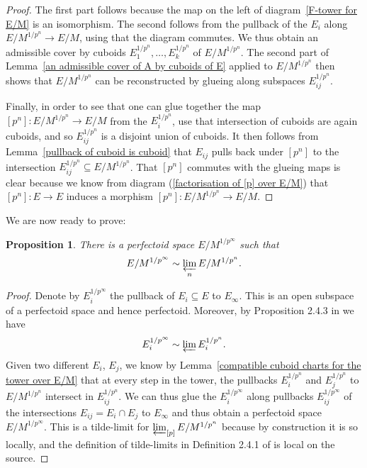 \documentclass[10pt,oneside]{amsart}
\newtheorem{proposition}[theorem]{Proposition}
\theoremstyle{definition}
\theoremstyle{remark}
\begin{document}
		\begin{proof}
		The first part follows because the map on the left of diagram~\ref{F-tower for E/M} is an isomorphism. The second follows from the pullback of the $E_i$ along $E/M^{1/p^n}\rightarrow E/M$, using that the diagram commutes.
		We thus obtain an admissible cover by cuboids $E_1^{1/p^n},\dots,E_k^{1/p^n}$ of $E/M^{1/p^n}$.
		The second part of Lemma~\ref{an admissible cover of A by cuboids of E} applied to $E/M^{1/p^n}$ then shows that $E/M^{1/p^n}$ can be reconstructed by glueing along subspaces $E_{ij}^{1/p^n}$.
		
		Finally, in order to see that one can glue together the map $[p^n]:E/M^{1/p^n}\rightarrow E/M$ from the $E_i^{1/p^n}$, use that intersection of cuboids are again cuboids, and so $E_{ij}^{1/p^n}$ is a disjoint union of cuboids. It then follows from Lemma~\ref{pullback of cuboid is cuboid} that $E_{ij}$ pulls back under $[p^n]$ to the intersection $E_{ij}^{1/p^n}\subseteq E/M^{1/p^n}$. That $[p^n]$ commutes with the glueing maps is clear because we know from diagram (\ref{factorisation of [p] over E/M}) that $[p^n]:E\rightarrow E$ induces a morphism $[p^n]:E/M^{1/p^n}\rightarrow E/M$.
		\end{proof}
		We are now ready to prove:
		\begin{proposition}\label{explicit construction of vertical tilde-limit}
			There is a perfectoid space $E/M^{1/p^\infty}$ such that\[E/M^{1/p^\infty}\sim \varprojlim_{n}E/M^{1/p^n}. \]
		\end{proposition}
		\begin{proof}
		 Denote by $E_i^{1/p^\infty}$ the pullback of $E_i\subseteq E$ to $E_\infty$. This is an open subspace of a perfectoid space and hence perfectoid. Moreover, by Proposition 2.4.3 in \cite{SW} we have  \[ E_i^{1/p^\infty}\sim \varprojlim E_i^{1/p^n}.\] 
		Given two different $E_i$, $E_j$, we know by Lemma~\ref{compatible cuboid charts for the tower over E/M} that at every step in the tower, the pullbacks $E_i^{1/p^n}$ and $E_j^{1/p^n}$ to $E/M^{1/p^n}$ intersect in  $E_{ij}^{1/p^n}$.
		We can thus glue the $E_i^{1/p^\infty}$ along pullbacks $E_{ij}^{1/p^\infty}$ of the intersections $E_{ij}=E_i\cap E_j$ to $E_\infty$ and thus obtain a perfectoid space $E/M^{1/p^\infty}$. This is a tilde-limit for $\varprojlim_{[p]}E/M^{1/p^n}$ because by construction it is so locally, and the definition of tilde-limits in Definition 2.4.1 of \cite{SW} is local on the source.
		\end{proof}
	 
\end{document}
